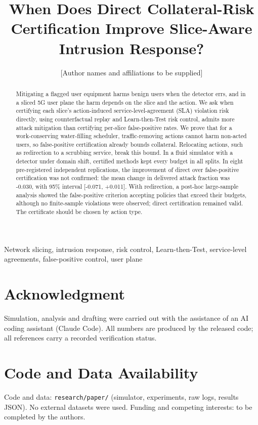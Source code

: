 \documentclass[journal]{IEEEtran}
\begin{document}
\title{When Does Direct Collateral-Risk Certification Improve Slice-Aware Intrusion Response?}
\author{[Author names and affiliations to be supplied]}
\maketitle
\begin{abstract}
Mitigating a flagged user equipment harms benign users when the detector
errs, and in a sliced 5G user plane the harm depends on the slice and
the action. We ask when certifying each slice's action-induced
service-level-agreement (SLA) violation risk directly, using
counterfactual replay and Learn-then-Test risk control, admits more
attack mitigation than certifying per-slice false-positive rates. We
prove that for a work-conserving water-filling scheduler,
traffic-removing actions cannot harm non-acted users, so false-positive
certification already bounds collateral. Relocating actions, such as
redirection to a scrubbing service, break this bound. In a fluid
simulator with a detector under domain shift, certified methods kept
every budget in all splits. In eight pre-registered independent
replications, the improvement of direct over false-positive
certification was not confirmed: the mean change in delivered attack
fraction was -0.030, with 95\% interval {[}-0.071, +0.011{]}. With
redirection, a post-hoc large-sample analysis showed the false-positive
criterion accepting policies that exceed their budgets, although no
finite-sample violations were observed; direct certification remained
valid. The certificate should be chosen by action type.
\end{abstract}
\begin{IEEEkeywords}
Network slicing, intrusion response, risk control, Learn-then-Test, service-level agreements, false-positive control, user plane
\end{IEEEkeywords}

\section*{Acknowledgment}
Simulation, analysis and drafting were carried out with the assistance of an AI coding assistant (Claude Code). All numbers are produced by the released code; all references carry a recorded verification status.
\section*{Code and Data Availability}
Code and data: \texttt{research/paper/} (simulator, experiments, raw
logs, results JSON). No external datasets were used. Funding and
competing interests: to be completed by the authors.


\end{document}
